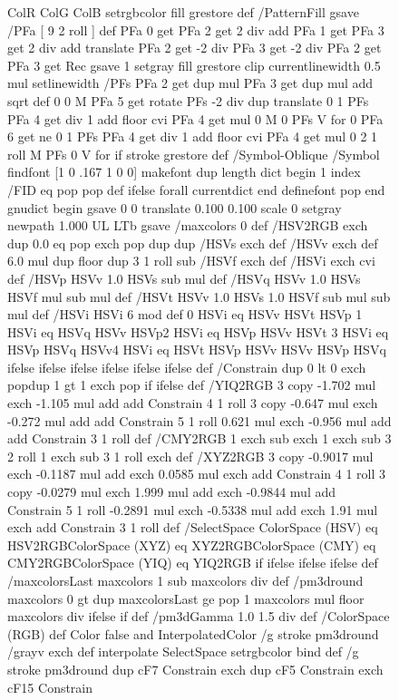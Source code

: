 \documentclass{LMCS}
\begin{document}
\begin{figure}[!tbp]
\begin{minipage}[b]{.47\linewidth}
{{{{  ColR ColG ColB setrgbcolor
  fill grestore } def
/PatternFill { gsave /PFa [ 9 2 roll ] def
    PFa 0 get PFa 2 get 2 div add PFa 1 get PFa 3 get 2 div add translate
    PFa 2 get -2 div PFa 3 get -2 div PFa 2 get PFa 3 get Rec
    gsave 1 setgray fill grestore clip
    currentlinewidth 0.5 mul setlinewidth
    /PFs PFa 2 get dup mul PFa 3 get dup mul add sqrt def
    0 0 M PFa 5 get rotate PFs -2 div dup translate
	0 1 PFs PFa 4 get div 1 add floor cvi
	{ PFa 4 get mul 0 M 0 PFs V } for
    0 PFa 6 get ne {
	0 1 PFs PFa 4 get div 1 add floor cvi
	{ PFa 4 get mul 0 2 1 roll M PFs 0 V } for
    } if
    stroke grestore } def
/Symbol-Oblique /Symbol findfont [1 0 .167 1 0 0] makefont
dup length dict begin {1 index /FID eq {pop pop} {def} ifelse} forall
currentdict end definefont pop
end
gnudict begin
gsave
0 0 translate
0.100 0.100 scale
0 setgray
newpath
1.000 UL
LTb
gsave /maxcolors 0 def
/HSV2RGB {  exch dup 0.0 eq {pop exch pop dup dup} { /HSVs exch def /HSVv exch def 6.0 mul dup floor dup 3 1 roll sub
     /HSVf exch def /HSVi exch cvi def /HSVp HSVv 1.0 HSVs sub mul def
	 /HSVq HSVv 1.0 HSVs HSVf mul sub mul def 
	 /HSVt HSVv 1.0 HSVs 1.0 HSVf sub mul sub mul def
	 /HSVi HSVi 6 mod def 0 HSVi eq {HSVv HSVt HSVp}
	 {1 HSVi eq {HSVq HSVv HSVp}{2 HSVi eq {HSVp HSVv HSVt}
	 {3 HSVi eq {HSVp HSVq HSVv}{4 HSVi eq {HSVt HSVp HSVv}
	 {HSVv HSVp HSVq} ifelse} ifelse} ifelse} ifelse} ifelse
  } ifelse} def
/Constrain {
  dup 0 lt {0 exch pop}{dup 1 gt {1 exch pop} if} ifelse} def
/YIQ2RGB {
  3 copy -1.702 mul exch -1.105 mul add add Constrain 4 1 roll
  3 copy -0.647 mul exch -0.272 mul add add Constrain 5 1 roll
  0.621 mul exch -0.956 mul add add Constrain 3 1 roll } def
/CMY2RGB {  1 exch sub exch 1 exch sub 3 2 roll 1 exch sub 3 1 roll exch } def
/XYZ2RGB {  3 copy -0.9017 mul exch -0.1187 mul add exch 0.0585 mul exch add
  Constrain 4 1 roll 3 copy -0.0279 mul exch 1.999 mul add exch
  -0.9844 mul add Constrain 5 1 roll -0.2891 mul exch -0.5338 mul add
  exch 1.91 mul exch add Constrain 3 1 roll} def
/SelectSpace {ColorSpace (HSV) eq {HSV2RGB}{ColorSpace (XYZ) eq {
  XYZ2RGB}{ColorSpace (CMY) eq {CMY2RGB}{ColorSpace (YIQ) eq {YIQ2RGB}
  if} ifelse} ifelse} ifelse} def
/maxcolorsLast {maxcolors 1 sub maxcolors div} def
/pm3dround {maxcolors 0 gt {dup maxcolorsLast ge {pop 1}
{maxcolors mul floor maxcolors div} ifelse} if} def
/pm3dGamma 1.0 1.5 div def
/ColorSpace (RGB) def
Color false and { InterpolatedColor { /g {stroke pm3dround /grayv exch def interpolate
        SelectSpace setrgbcolor} bind def
  }{
  /g {stroke pm3dround dup cF7 Constrain exch dup cF5 Constrain exch cF15 Constrain 
}}}}}}
\end{minipage}
\end{figure}
\end{document}
